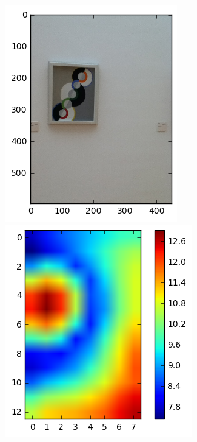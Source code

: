 \begin{figure}[!htb]
  \begin{minipage}[c]{.33\linewidth}
    \includegraphics[width=\linewidth]{figures/sample3_30P-0976.png}
  \end{minipage} \hfill
  \begin{minipage}[c]{.33\linewidth}
    \includegraphics[width=\linewidth]{figures/sample3_heatmap.png}

\end{minipage}
\end{figure}
